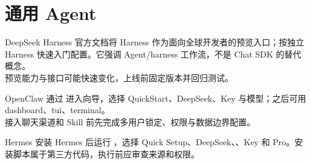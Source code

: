 \documentclass[aspectratio=169,UTF8]{ctexbeamer}
\begin{document}
\section{通用 Agent}
\begin{frame}{DeepSeek Harness}
官方文档将 Harness 作为面向全球开发者的预览入口；按独立 Harness 快速入门配置。它强调 Agent/harness 工作流，不是 Chat SDK 的替代概念。\\[8pt]
预览能力与接口可能快速变化，上线前固定版本并回归测试。
\end{frame}
\begin{frame}{OpenClaw}
通过  进入向导，选择 QuickStart、DeepSeek、Key 与模型；之后可用 dashboard、tui、terminal。\\[8pt]
接入聊天渠道和 Skill 前先完成多用户锁定、权限与数据边界配置。
\end{frame}
\begin{frame}{Hermes}
安装 Hermes 后运行 ，选择 Quick Setup、DeepSeek、、Key 和 Pro。安装脚本属于第三方代码，执行前应审查来源和权限。
\end{frame}
\end{document}
